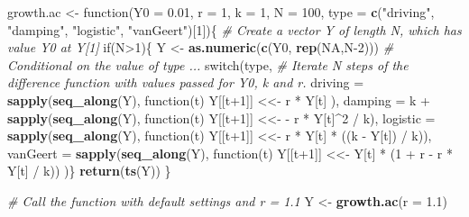 \documentclass[]{book}
\newenvironment{Shaded}{\begin{snugshade}}{\end{snugshade}}
\newcommand{\KeywordTok}[1]{\textcolor[rgb]{0.13,0.29,0.53}{\textbf{{#1}}}}
\newcommand{\DataTypeTok}[1]{\textcolor[rgb]{0.13,0.29,0.53}{{#1}}}
\newcommand{\DecValTok}[1]{\textcolor[rgb]{0.00,0.00,0.81}{{#1}}}
\newcommand{\FloatTok}[1]{\textcolor[rgb]{0.00,0.00,0.81}{{#1}}}
\newcommand{\StringTok}[1]{\textcolor[rgb]{0.31,0.60,0.02}{{#1}}}
\newcommand{\CommentTok}[1]{\textcolor[rgb]{0.56,0.35,0.01}{\textit{{#1}}}}
\newcommand{\OtherTok}[1]{\textcolor[rgb]{0.56,0.35,0.01}{{#1}}}
\newcommand{\NormalTok}[1]{{#1}}
\begin{document}
\begin{Shaded}
\begin{Highlighting}[]
\NormalTok{growth.ac <-}\StringTok{ }\NormalTok{function(}\DataTypeTok{Y0 =} \FloatTok{0.01}\NormalTok{, }\DataTypeTok{r =} \DecValTok{1}\NormalTok{, }\DataTypeTok{k =} \DecValTok{1}\NormalTok{, }\DataTypeTok{N =} \DecValTok{100}\NormalTok{, }\DataTypeTok{type =} \KeywordTok{c}\NormalTok{(}\StringTok{"driving"}\NormalTok{, }\StringTok{"damping"}\NormalTok{, }\StringTok{"logistic"}\NormalTok{, }\StringTok{"vanGeert"}\NormalTok{)[}\DecValTok{1}\NormalTok{])\{}
    \CommentTok{# Create a vector Y of length N, which has value Y0 at Y[1]}
    \NormalTok{if(N>}\DecValTok{1}\NormalTok{)\{}
    \NormalTok{Y <-}\StringTok{ }\KeywordTok{as.numeric}\NormalTok{(}\KeywordTok{c}\NormalTok{(Y0, }\KeywordTok{rep}\NormalTok{(}\OtherTok{NA}\NormalTok{,N}\DecValTok{-2}\NormalTok{)))}
    \CommentTok{# Conditional on the value of type ... }
    \NormalTok{switch(type, }
           \CommentTok{# Iterate N steps of the difference function with values passed for Y0, k and r.}
           \DataTypeTok{driving  =} \KeywordTok{sapply}\NormalTok{(}\KeywordTok{seq_along}\NormalTok{(Y), function(t) Y[[t}\DecValTok{+1}\NormalTok{]] <<-}\StringTok{ }\NormalTok{r *}\StringTok{ }\NormalTok{Y[t] ),}
           \DataTypeTok{damping  =} \NormalTok{k +}\StringTok{ }\KeywordTok{sapply}\NormalTok{(}\KeywordTok{seq_along}\NormalTok{(Y), function(t) Y[[t}\DecValTok{+1}\NormalTok{]] <<-}\StringTok{ }\NormalTok{-}\StringTok{ }\NormalTok{r *}\StringTok{ }\NormalTok{Y[t]^}\DecValTok{2} \NormalTok{/}\StringTok{ }\NormalTok{k),}
           \DataTypeTok{logistic =} \KeywordTok{sapply}\NormalTok{(}\KeywordTok{seq_along}\NormalTok{(Y), function(t) Y[[t}\DecValTok{+1}\NormalTok{]] <<-}\StringTok{ }\NormalTok{r *}\StringTok{ }\NormalTok{Y[t] *}\StringTok{ }\NormalTok{((k -}\StringTok{ }\NormalTok{Y[t]) /}\StringTok{ }\NormalTok{k)),}
           \DataTypeTok{vanGeert =} \KeywordTok{sapply}\NormalTok{(}\KeywordTok{seq_along}\NormalTok{(Y), function(t) Y[[t}\DecValTok{+1}\NormalTok{]] <<-}\StringTok{ }\NormalTok{Y[t] *}\StringTok{ }\NormalTok{(}\DecValTok{1} \NormalTok{+}\StringTok{ }\NormalTok{r -}\StringTok{ }\NormalTok{r *}\StringTok{ }\NormalTok{Y[t] /}\StringTok{ }\NormalTok{k)) }
    \NormalTok{)\}}
    \KeywordTok{return}\NormalTok{(}\KeywordTok{ts}\NormalTok{(Y))}
\NormalTok{\}}

\CommentTok{# Call the function with default settings and r = 1.1}
\NormalTok{Y <-}\StringTok{ }\KeywordTok{growth.ac}\NormalTok{(}\DataTypeTok{r =} \FloatTok{1.1}\NormalTok{)}
\end{Highlighting}
\end{Shaded}
\end{document}
